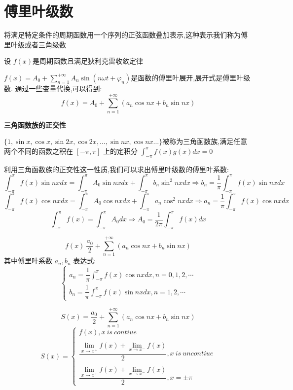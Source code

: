 \section{傅里叶级数}
将满足特定条件的周期函数用一个序列的正弦函数叠加表示,这种表示我们称为傅里叶级或者三角级数
\begin{definition}[傅里叶级数]\label{def: 傅里叶级数}
	设 $f(x)$是周期函数且满足狄利克雷收敛定律

	$f(x)=A_{0}+\sum\limits_{n=1}^{+\infty}A_{n}\sin (n\omega t+\varphi_{n})$是函数的傅里叶展开,展开式是傅里叶级数.
	通过一些变量代换,可以得到:
	$$f(x)=A_{0}+\sum\limits_{n=1}^{+\infty}(a_{n}\cos nx+b_{n}\sin nx)$$
\end{definition}
\textbf{三角函数族的正交性}
\begin{definition}
	$\{1,\sin x,\cos x,\sin 2x,\cos 2x,\dots,\sin nx,\cos nx\dots\}$被称为三角函数族,满足任意两个不同的函数之积在 $[-\pi,\pi]$ 上的定积分 $\int_{-\pi}^{\pi}f(x)g(x)dx=0$
\end{definition}
利用三角函数族的正交性这一性质,我们可以求出傅里叶级数的傅里叶系数:
$$\int_{-\pi}^{\pi}f(x)\sin nxdx=\int_{-\pi}^{\pi}A_{0}\sin nxdx+\int_{-\pi}^{\pi}b_{n}\sin^{2}nxdx \Rightarrow b_{n}=\frac{1}{\pi}\int_{-\pi}^{\pi}f(x)\sin nxdx$$
$$\int_{-\pi}^{\pi}f(x)\cos nxdx=\int_{-\pi}^{\pi}A_{0}\cos nxdx+\int_{-\pi}^{\pi}a_{n}\cos^{2}nxdx \Rightarrow a_{n}=\frac{1}{\pi}\int_{-\pi}^{\pi}f(x)\cos nxdx$$
$$\int_{-\pi}^{\pi}f(x)=\int_{-\pi}^{\pi}A_{0}dx\Rightarrow A_{0}=\frac{1}{2\pi}\int_{-\pi}^{\pi}f(x)dx$$
\begin{theorem}
	$$f(x)~\frac{a_{0}}{2}+\sum\limits_{n=1}^{+\infty}(a_{n}\cos nx+b_{n}\sin nx)$$
	其中傅里叶系数 $a_{n},b_{n}$ 表达式:
	$$\left\lbrace \begin{array}{l}
			a_{n}=\dfrac{1}{\pi}\int_{-\pi}^{\pi}f(x)\cos nxdx,n=0,1,2,\cdots \\
			b_{n}=\dfrac{1}{\pi}\int_{-\pi}^{\pi}f(x)\sin nxdx,n=1,2,\cdots
		\end{array}\right. $$
\end{theorem}
\begin{theorem}
	$$S(x)=\frac{a_{0}}{2}+\sum\limits_{n=1}^{+\infty}(a_{n}\cos nx+b_{n}\sin nx)$$
	$$S(x)=\left\lbrace \begin{array}{l}
			f(x),x\ is\ contiue \\
			\\
			\dfrac{\lim\limits_{x\rightarrow x^{+}}f(x)+\lim\limits_{x\rightarrow x^{-}}f(x)}{2},x\ is\ uncontiue
			\\
			\\
			\dfrac{\lim\limits_{x\rightarrow x^{+}}f(x)+\lim\limits_{x\rightarrow x^{-}}f(x)}{2},x=\pm\pi
		\end{array}\right. $$
\end{theorem}

